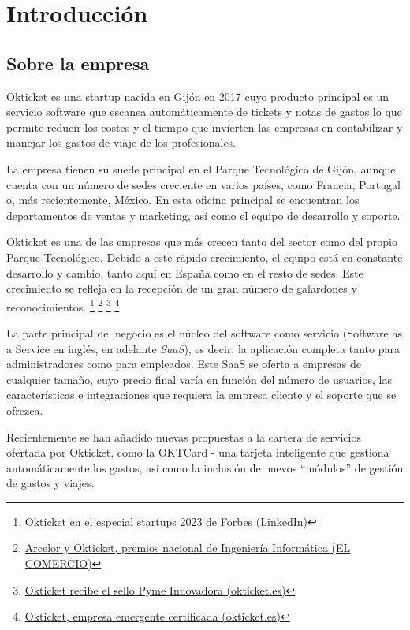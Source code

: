 \chapter{Introducción}
\section{Sobre la empresa}
Okticket es una startup nacida en Gijón en 2017 cuyo producto principal es un servicio software
que escanea automáticamente de tickets y notas de gastos lo que permite reducir los costes y el
tiempo que invierten las empresas en contabilizar y manejar los gastos de viaje de los profesionales.

La empresa tienen su suede principal en el Parque Tecnológico de Gijón, aunque cuenta con un número
de sedes creciente en varios países, como Francia, Portugal o, más recientemente, México. En esta
oficina principal se encuentran los departamentos de ventas y marketing, así como el equipo de
desarrollo y soporte.

Okticket es una de las empresas que más crecen tanto del sector como del propio Parque
Tecnológico. Debido a este rápido crecimiento, el equipo está en constante desarrollo y
cambio, tanto aquí en España como en el resto de sedes. Este crecimiento se refleja
en la recepción de un gran número de galardones y reconocimientos.
\footnote{\href{https://www.linkedin.com/posts/okticket_okticket-en-el-especial-startups-de-forbes-activity-7140622980618903552-UGWK}{Okticket en el especial startups 2023 de Forbes (LinkedIn)}}
\footnote{\href{https://www.elcomercio.es/economia/arcelor-okticket-premios-20230222002438-ntvo.html}{Arcelor y Okticket, premios nacional de Ingeniería Informática (EL COMERCIO)}}
\footnote{\href{https://www.okticket.es/blog/empresa-pyme-innovadora}{Okticket recibe el sello Pyme Innovadora (okticket.es)}}
\footnote{\href{https://www.okticket.es/blog/okticket-empresa-emergente-certificada}{Okticket, empresa emergente certificada (okticket.es)}}

La parte principal del negocio es el núcleo del software como servicio (Software as a
Service en inglés, en adelante \textit{SaaS}), es decir, la aplicación completa tanto
para administradores como para empleados. Este SaaS se oferta a empresas de cualquier
tamaño, cuyo precio final varía en función del número de usuarios, las características
e integraciones que requiera la empresa cliente y el soporte que se ofrezca.

Recientemente se han añadido nuevas propuestas a la cartera de servicios ofertada por
Okticket, como la OKTCard {-} una tarjeta inteligente que gestiona automáticamente los gastos,
así como la inclusión de nuevos ``módulos'' de gestión de gastos y viajes.

